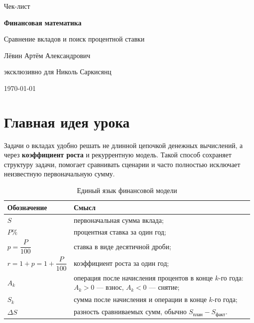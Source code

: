 \documentclass[a4paper,12pt]{article}
\newcommand{\term}[1]{\textcolor{darkaccent}{\textbf{#1}}}
\begin{document}
\begin{titlepage}
  \thispagestyle{empty}
  \centering
  \vspace*{25mm}
  {\Large\textcolor{accent}{Чек-лист}\par}
  \vspace{7mm}
  {\Huge\bfseries\textcolor{darkaccent}{Финансовая математика}\par}
  \vspace{3mm}
  {\LARGE Сравнение вкладов и поиск процентной ставки\par}
  \vfill
  {\large Лёвин Артём Александрович\par}
  {\large эксклюзивно для Николь Саркисянц\par}
  \vspace{8mm}
  {\large \today\par}
  \vfill
  \vspace*{8mm}
\end{titlepage}

\tableofcontents
\clearpage

\section{Главная идея урока}

Задачи о вкладах удобно решать не длинной цепочкой денежных вычислений, а через
\term{коэффициент роста} и рекуррентную модель. Такой способ сохраняет структуру
задачи, помогает сравнивать сценарии и часто полностью исключает неизвестную
первоначальную сумму.

\begin{table}[ht]
\centering
\caption{Единый язык финансовой модели}
\begin{tabularx}{\linewidth}{@{}>{\bfseries}lX@{}}
\toprule
Обозначение & Смысл \\
\midrule
$S$ & первоначальная сумма вклада; \\
$P\%$ & процентная ставка за один год; \\
$p=\dfrac{P}{100}$ & ставка в виде десятичной дроби; \\
$r=1+p=1+\dfrac{P}{100}$ & коэффициент роста за один год; \\
$A_k$ & операция после начисления процентов в конце $k$-го года:
$A_k>0$ --- взнос, $A_k<0$ --- снятие; \\
$S_k$ & сумма после начисления и операции в конце $k$-го года; \\
$\Delta S$ & разность сравниваемых сумм, обычно
$S_{\text{план}}-S_{\text{факт}}$. \\
\bottomrule
\end{tabularx}
\end{table}
\end{document}
